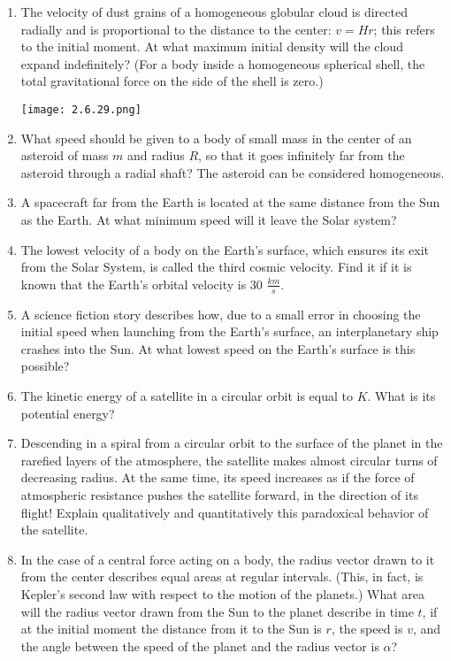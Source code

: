 \documentclass{article}
\begin{document}
\begin{enumerate}[label=2.6.\arabic*]
\item The velocity of dust grains of a homogeneous globular cloud is directed radially and is proportional to the distance to the center: $v = Hr$; this refers to the initial moment. At what maximum initial density will the cloud expand indefinitely? (For a body inside a homogeneous spherical shell, the total gravitational force on the side of the shell is zero.)

\begin{center}
    \texttt{[image: 2.6.29.png]}
\end{center}

\item What speed should be given to a body of small mass in the center of an asteroid of mass $m$ and radius $R$, so that it goes infinitely far from the asteroid through a radial shaft? The asteroid can be considered homogeneous.

\item A spacecraft far from the Earth is located at the same distance from the Sun as the Earth. At what minimum speed will it leave the Solar system?

\item The lowest velocity of a body on the Earth's surface, which ensures its exit from the Solar System, is called the third cosmic velocity. Find it if it is known that the Earth's orbital velocity is $30$ $\frac{km}{s}$.

\item A science fiction story describes how, due to a small error in choosing the initial speed when launching from the Earth's surface, an interplanetary ship crashes into the Sun. At what lowest speed on the Earth's surface is this possible?

\item The kinetic energy of a satellite in a circular orbit is equal to $K$. What is its potential energy?

\item Descending in a spiral from a circular orbit to the surface of the planet in the rarefied layers of the atmosphere, the satellite makes almost circular turns of decreasing radius. At the same time, its speed increases as if the force of atmospheric resistance pushes the satellite forward, in the direction of its flight! Explain qualitatively and quantitatively this paradoxical behavior of the satellite.

\item In the case of a central force acting on a body, the radius vector drawn to it from the center describes equal areas at regular intervals. (This, in fact, is Kepler's second law with respect to the motion of the planets.) What area will the radius vector drawn from the Sun to the planet describe in time $t$, if at the initial moment the distance from it to the Sun is $r$, the speed is $v$, and the angle between the speed of the planet and the radius vector is $\alpha$?


\end{enumerate}
\end{document}

